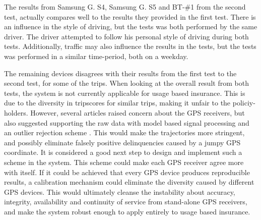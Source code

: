 The results from Samsung G. S4, Samsung G. S5 and BT-\#1 from the second test, actually compares well to the results they provided in the first test. There is an influence in the style of driving, but the tests was both performed by the same driver. The driver attempted to follow his personal style of driving during both tests. Additionally, traffic may also influence the results in the tests, but the tests was performed in a similar time-period, both on a weekday. 

The remaining devices disagrees with their results from the first test to the second test, for some of the trips. When looking at the overall result from both tests, the system is not currently applicable for usage based insurance. This is due to the diversity in tripscores for similar trips, making it unfair to the policiy-holders. However, several articles raised concern about the GPS receivers, but also suggested supporting the raw data with model based signal processing and an outlier rejection scheme\citep{art:challenges_smartphone_ubi} \citep{art:insurtelematics} \citep{art:smartphones_for_monitoring_and_ubi}. This would make the trajectories more stringent, and possibly eliminate falsely positive delinquencies caused by a jumpy GPS coordinate. It is considered a good next step to design and implement such a scheme in the system. This scheme could make each GPS receiver agree more with itself. If it could be achieved that every GPS device produces reproducible results, a calibration mechanism could eliminate the diversity caused by different GPS devices. This would ultimately cleanse the instability about accuracy, integrity, availability and continuity of service from stand-alone GPS receivers, and make the system robust enough to apply entirely to usage based insurance.


